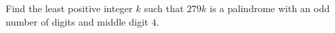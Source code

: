 Find the least positive integer $k$ such that $279k$ is a palindrome with an odd number of digits and middle digit $4$.
